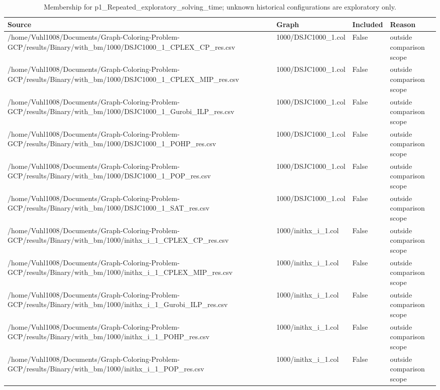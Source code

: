 \begin{table}[htbp]
\centering
\caption{Membership for p1\_Repeated\_exploratory\_solving\_time; unknown historical configurations are exploratory only.}
\label{tab:p1-Repeated-exploratory-solving-time-membership}
\begin{tabular}{llll}
\hline
Source & Graph & Included & Reason \\
\hline
/home/Vuhl1008/Documents/Graph-Coloring-Problem-GCP/results/Binary/with\_bm/1000/DSJC1000\_1\_CPLEX\_CP\_res.csv & 1000/DSJC1000\_1.col & False & outside comparison scope \\
/home/Vuhl1008/Documents/Graph-Coloring-Problem-GCP/results/Binary/with\_bm/1000/DSJC1000\_1\_CPLEX\_MIP\_res.csv & 1000/DSJC1000\_1.col & False & outside comparison scope \\
/home/Vuhl1008/Documents/Graph-Coloring-Problem-GCP/results/Binary/with\_bm/1000/DSJC1000\_1\_Gurobi\_ILP\_res.csv & 1000/DSJC1000\_1.col & False & outside comparison scope \\
/home/Vuhl1008/Documents/Graph-Coloring-Problem-GCP/results/Binary/with\_bm/1000/DSJC1000\_1\_POHP\_res.csv & 1000/DSJC1000\_1.col & False & outside comparison scope \\
/home/Vuhl1008/Documents/Graph-Coloring-Problem-GCP/results/Binary/with\_bm/1000/DSJC1000\_1\_POP\_res.csv & 1000/DSJC1000\_1.col & False & outside comparison scope \\
/home/Vuhl1008/Documents/Graph-Coloring-Problem-GCP/results/Binary/with\_bm/1000/DSJC1000\_1\_SAT\_res.csv & 1000/DSJC1000\_1.col & False & outside comparison scope \\
/home/Vuhl1008/Documents/Graph-Coloring-Problem-GCP/results/Binary/with\_bm/1000/inithx\_i\_1\_CPLEX\_CP\_res.csv & 1000/inithx\_i\_1.col & False & outside comparison scope \\
/home/Vuhl1008/Documents/Graph-Coloring-Problem-GCP/results/Binary/with\_bm/1000/inithx\_i\_1\_CPLEX\_MIP\_res.csv & 1000/inithx\_i\_1.col & False & outside comparison scope \\
/home/Vuhl1008/Documents/Graph-Coloring-Problem-GCP/results/Binary/with\_bm/1000/inithx\_i\_1\_Gurobi\_ILP\_res.csv & 1000/inithx\_i\_1.col & False & outside comparison scope \\
/home/Vuhl1008/Documents/Graph-Coloring-Problem-GCP/results/Binary/with\_bm/1000/inithx\_i\_1\_POHP\_res.csv & 1000/inithx\_i\_1.col & False & outside comparison scope \\
/home/Vuhl1008/Documents/Graph-Coloring-Problem-GCP/results/Binary/with\_bm/1000/inithx\_i\_1\_POP\_res.csv & 1000/inithx\_i\_1.col & False & outside comparison scope \\

\end{tabular}
\end{table}
